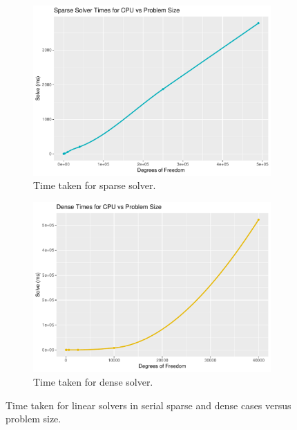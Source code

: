 \begin{figure}
	\centering
	\begin{subfigure}{0.48\linewidth}
		\centering
		\includegraphics[width = \linewidth]{Plots/solve_sparse_cpu}
		\caption{Time taken for sparse solver.}
		\label{fig:solve_sparse_cpu}
	\end{subfigure}\hfill
	\begin{subfigure}{0.48\linewidth}
		\centering
		\includegraphics[width=\linewidth]{Plots/solve_dense_cpu}
		\caption{Time taken for dense solver.}
		\label{fig:solve_dense_cpu}
	\end{subfigure}
	\caption{Time taken for linear solvers in serial sparse and dense cases versus problem size.}
	\label{fig:solve_cpu}
\end{figure}

